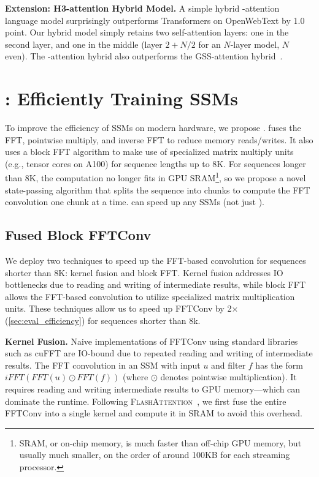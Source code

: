 \textbf{Extension: H3-attention Hybrid Model.}
A simple hybrid \hthree-attention language model surprisingly outperforms Transformers on OpenWebText by 1.0 point.
Our hybrid model simply retains two self-attention layers: one in the second layer, and one in the middle (layer $2 + N / 2$ for an $N$-layer model, $N$ even).
The \hthree-attention hybrid also outperforms the GSS-attention hybrid~\citep{mehta2022long}.


\section{\fastfft: Efficiently Training SSMs\label{sec:efficiency}}

To improve the efficiency of SSMs on modern hardware, we propose \fastfft.
\fastfft fuses the FFT, pointwise multiply, and inverse FFT to reduce memory
reads/writes.
It also uses a block FFT algorithm to make use of specialized matrix multiply units (e.g., tensor cores on A100) for sequence lengths up to 8K.
For sequences longer than 8K, the computation no longer fits in GPU SRAM\footnote{SRAM, or on-chip memory, is much faster than off-chip GPU memory, but usually much smaller, on the order of around 100KB for each streaming processor.}, so we
propose a novel state-passing algorithm that splits the sequence into chunks to
compute the FFT convolution one chunk at a time.
\fastfft can speed up any SSMs (not just \hthree).


\subsection{Fused Block FFTConv}
\label{sec:systolic_fft}

We deploy two techniques to speed up the FFT-based convolution for sequences shorter than 8K: kernel fusion and block FFT.
Kernel fusion addresses IO bottlenecks due to reading and writing of intermediate results, while block FFT allows the FFT-based convolution to utilize specialized matrix multiplication units.
These techniques allow us to speed up FFTConv
by 2$\times$ (\cref{sec:eval_efficiency}) for sequences shorter than 8k.

\textbf{Kernel Fusion.}
Naive implementations of FFTConv using standard libraries such as cuFFT are IO-bound due to repeated reading and writing of intermediate results.
The FFT convolution in an SSM with input $u$ and filter $f$ has the form $iFFT(FFT(u) \odot FFT(f))$ (where $\odot$ denotes pointwise multiplication).
It requires reading and writing intermediate results to GPU memory---which can dominate the runtime.
Following \textsc{FlashAttention}~\citep{dao2022flashattention}, we first fuse the entire FFTConv into a single kernel and compute it in SRAM to avoid this overhead.

